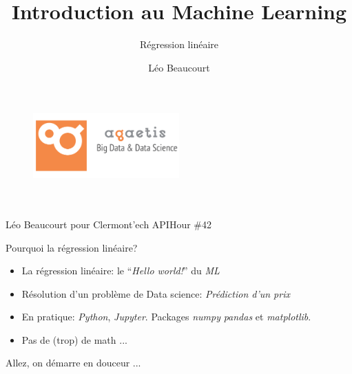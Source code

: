 \documentclass[aspectratio=169, 11pt]{beamer}
\title[Introduction au Machine Learning]{Introduction au Machine Learning}
\subtitle[Régression linéaire]{Régression linéaire}
\author{Léo Beaucourt}
\institute{Agaetis}
\begin{document}
\begin{frame}
  \begin{figure}
    \includegraphics[width=0.5\textwidth]{figs/AGAETIS_GREY}
  \end{figure}
  \begin{center}
    \Large
    \textcolor{agaetisOrange}{\insertshorttitle}\\
    \large
    \textcolor{agaetisOrange}{\insertshortsubtitle}\\
    \normalsize
    \vspace{0.5cm}
    Léo Beaucourt pour Clermont'ech APIHour \#42
  \end{center}    
\end{frame}


\begin{frame}{Pourquoi la régression linéaire?}

  \begin{itemize}
  \item La régression linéaire: le \textcolor{agaetisOrange}{``\textit{Hello world!}''} du \textit{ML}
    \vspace{0.2cm}
  \item Résolution d'un problème de Data science: \textit{Prédiction d'un prix}
    \vspace{0.2cm}
  \item En pratique: \textit{Python}, \textit{Jupyter}. Packages \textit{numpy} \textit{pandas} et \textit{matplotlib}.
    \vspace{0.2cm}
  \item Pas de (trop) de math ...
  \end{itemize}

  \vfill
  \begin{center}
    \large
    \textcolor{agaetisOrange}{Allez, on démarre en douceur ...}
  \end{center}

\end{frame}
\end{document}
